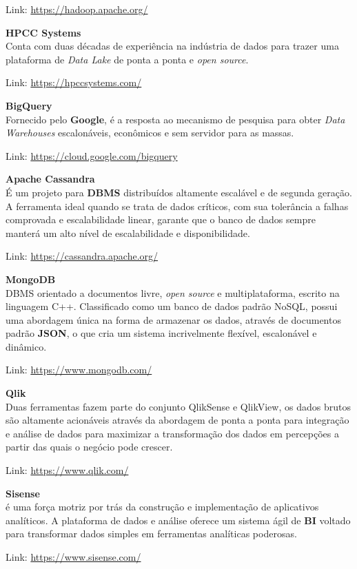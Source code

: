 \documentclass[fleqn,10pt]{../sty/SelfArx} %
\begin{document}
Link: \url{https://hadoop.apache.org/}

\textbf{HPCC Systems} \\
Conta com duas décadas de experiência na indústria de dados para trazer uma plataforma de \textit{Data Lake} de ponta a ponta e \textit{open source}.

Link: \url{https://hpccsystems.com/}

\textbf{BigQuery} \\
Fornecido pelo \textbf{Google}, é a resposta ao mecanismo de pesquisa para obter \textit{Data Warehouses} escalonáveis, econômicos e sem servidor para as massas.

Link: \url{https://cloud.google.com/bigquery}

\textbf{Apache Cassandra} \\
É um projeto para \textbf{DBMS} distribuídos altamente escalável e de segunda geração. A ferramenta ideal quando se trata de dados críticos, com sua tolerância a falhas comprovada e escalabilidade linear, garante que o banco de dados sempre manterá um alto nível de escalabilidade e disponibilidade.

Link: \url{https://cassandra.apache.org/}

\textbf{MongoDB} \\
DBMS orientado a documentos livre, \textit{open source} e multiplataforma, escrito na linguagem C++. Classificado como um banco de dados padrão NoSQL, possui uma abordagem única na forma de armazenar os dados, através de documentos padrão \textbf{JSON}, o que cria um sistema incrivelmente flexível, escalonável e dinâmico.

Link: \url{https://www.mongodb.com/}

\textbf{Qlik} \\
Duas ferramentas fazem parte do conjunto QlikSense e QlikView, os dados brutos são altamente acionáveis através da abordagem de ponta a ponta para integração e análise de dados para maximizar a transformação dos dados em percepções a partir das quais o negócio pode crescer.

Link: \url{https://www.qlik.com/}

\textbf{Sisense} \\
é uma força motriz por trás da construção e implementação de aplicativos analíticos. A plataforma de dados e análise oferece um sistema ágil de \textbf{BI} voltado para transformar dados simples em ferramentas analíticas poderosas.

Link: \url{https://www.sisense.com/}
\end{document}
